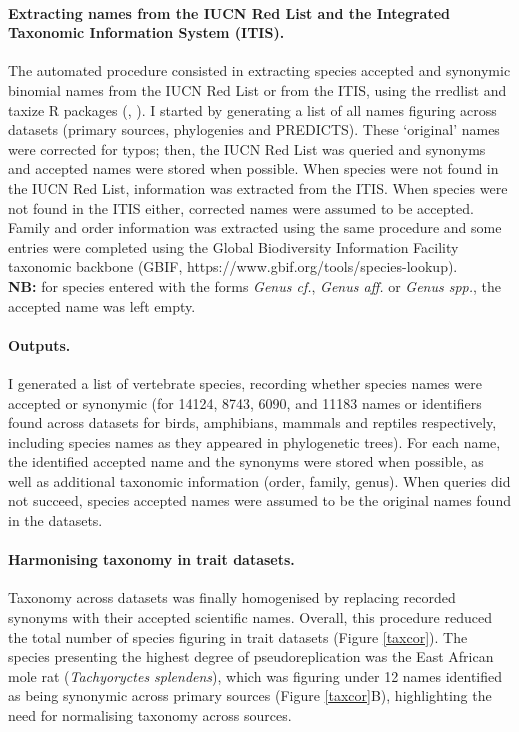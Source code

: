\paragraph{Extracting names from the IUCN Red List and the Integrated Taxonomic Information System (ITIS).}
The automated procedure consisted in extracting species accepted and synonymic binomial names from the IUCN Red List or from the ITIS, using the rredlist and taxize R packages (\cite{rredlist}, \cite{Chamberlain2013}). I started by generating a list of all names figuring across datasets (primary sources, phylogenies and PREDICTS). These `original' names were corrected for typos; then, the IUCN Red List was queried and synonyms and accepted names were stored when possible. When species were not found in the IUCN Red List, information was extracted from the ITIS. When species were not found in the ITIS either, corrected names were assumed to be accepted. Family and order information was extracted using the same procedure and some entries were completed using the Global Biodiversity Information Facility taxonomic backbone (GBIF, https://www.gbif.org/tools/species-lookup).\\
\textbf{NB:} for species entered with the forms \textit{Genus cf.}, \textit{Genus aff.} or \textit{Genus spp.}, the accepted name was left empty.

\paragraph{Outputs.} I generated a list of vertebrate species, recording whether species names were accepted or synonymic (for 14124, 8743, 6090, and 11183 names or identifiers found across datasets for birds, amphibians, mammals and reptiles respectively, including species names as they appeared in phylogenetic trees). For each name, the identified accepted name and the synonyms were stored when possible, as well as additional taxonomic information (order, family, genus). When queries did not succeed, species accepted names were assumed to be the original names found in the datasets.

\paragraph{Harmonising taxonomy in trait datasets.}
Taxonomy across datasets was finally homogenised by replacing recorded synonyms with their accepted scientific names. Overall, this procedure  reduced the total number of species figuring in trait datasets (Figure \ref{taxcor}). The species presenting the highest degree of pseudoreplication was the East African mole rat (\textit{Tachyoryctes splendens}), which was figuring under 12 names identified as being synonymic across primary sources (Figure \ref{taxcor}B), highlighting the need for normalising taxonomy across sources.

